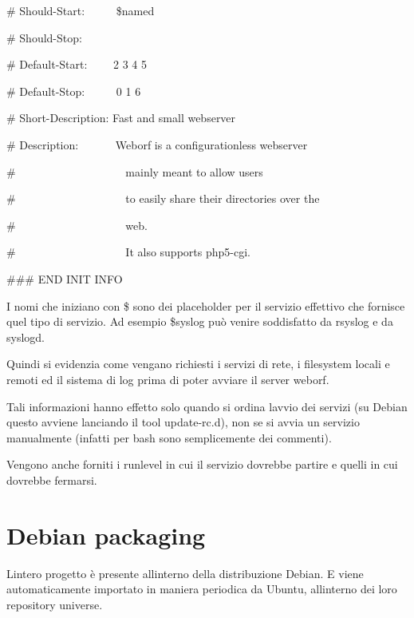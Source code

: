 \documentclass[a4paper,11pt]{article}
\begin{document}
{\ttfamily
\# Should-Start: \ \ \ \ \ \$named}

{\ttfamily
\# Should-Stop:}

{\ttfamily
\# Default-Start: \ \ \ \ 2 3 4 5}

{\ttfamily
\# Default-Stop: \ \ \ \ \ 0 1 6}

{\ttfamily
\# Short-Description: Fast and small webserver}

{\ttfamily
\# Description: \ \ \ \ \ \ Weborf is a configurationless webserver}

{\ttfamily
\# \ \ \ \ \ \ \ \ \ \ \ \ \ \ \ \ \ \ \ mainly meant to allow users}

{\ttfamily
\# \ \ \ \ \ \ \ \ \ \ \ \ \ \ \ \ \ \ \ to easily share their
directories over the}

{\ttfamily
\# \ \ \ \ \ \ \ \ \ \ \ \ \ \ \ \ \ \ \ web.}

{\ttfamily
\# \ \ \ \ \ \ \ \ \ \ \ \ \ \ \ \ \ \ \ It also supports php5-cgi.}

{\ttfamily
\#\#\# END INIT INFO}


\bigskip

{\sffamily
I nomi che iniziano con \$ sono dei placeholder per il servizio
effettivo che fornisce quel tipo di servizio. Ad esempio \$syslog pu\`o
venire soddisfatto da rsyslog e da syslogd\cite{LSB03}.}

{\sffamily
Quindi si evidenzia come vengano richiesti i servizi di rete, i
filesystem locali e remoti ed il sistema di log prima di poter avviare
il server weborf.}

{\sffamily
Tali informazioni hanno effetto solo quando si ordina
l{\textquotesingle}avvio dei servizi (su Debian questo avviene
lanciando il tool update-rc.d), non se si avvia un servizio manualmente
(infatti per bash sono semplicemente dei commenti).}

{\sffamily
Vengono anche forniti i runlevel in cui il servizio dovrebbe partire e
quelli in cui dovrebbe fermarsi.}


\bigskip

\section{Debian packaging}
{\sffamily
L{\textquotesingle}intero progetto \`e presente
all{\textquotesingle}interno della distribuzione Debian\cite{LSB04}. E viene
automaticamente importato in maniera periodica da Ubuntu,
all{\textquotesingle}interno dei loro repository universe.}


\bigskip
\end{document}
